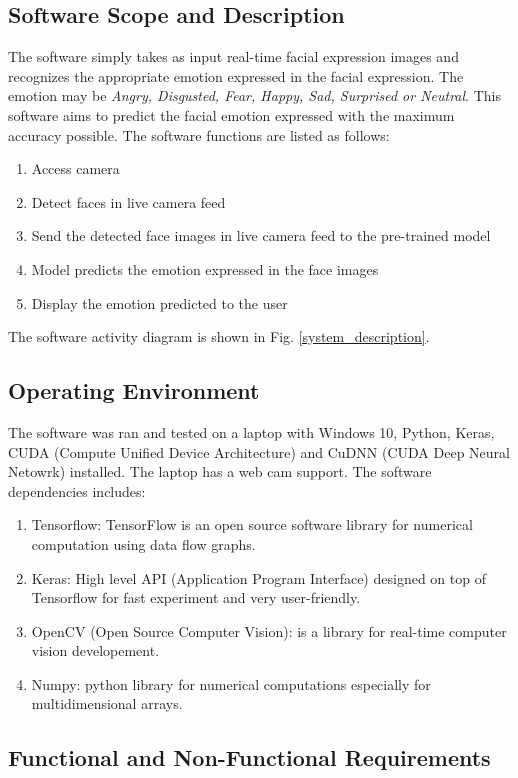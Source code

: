 \documentclass[master]{thesis-uestc}
\begin{document}
\subsection{Software Scope and Description}
The software simply takes as input real-time facial expression images and recognizes the appropriate emotion expressed in the facial expression. The emotion may be \textit{Angry, Disgusted, Fear, Happy, Sad,
Surprised or Neutral}. This software aims to predict the facial emotion expressed with the maximum accuracy possible. The software functions are listed as follows:
\begin{enumerate}
    \item Access camera
    \item Detect faces in live camera feed
    \item Send the detected face images in live camera feed to the pre-trained model
    \item Model predicts the emotion expressed in the face images
    \item Display the emotion predicted to the user
\end{enumerate}
The software activity diagram is shown in Fig. \ref{system_description}.

\subsection{Operating Environment}
The software was ran and tested on a laptop with Windows 10, Python, Keras, CUDA (Compute Unified Device Architecture) and CuDNN (CUDA Deep Neural Netowrk) installed. The laptop has a web cam support. The software dependencies includes:
\begin{enumerate}
    \item Tensorflow: TensorFlow is an open source software library for numerical computation using data flow graphs.
    \item Keras: High level API (Application Program Interface) designed on top of Tensorflow for fast experiment and very user-friendly.
    \item OpenCV (Open Source Computer Vision): is a library for real-time computer vision developement.
    \item Numpy: python library for numerical computations especially for multidimensional arrays. 
\end{enumerate}

\subsection{Functional and Non-Functional Requirements}
\end{document}
